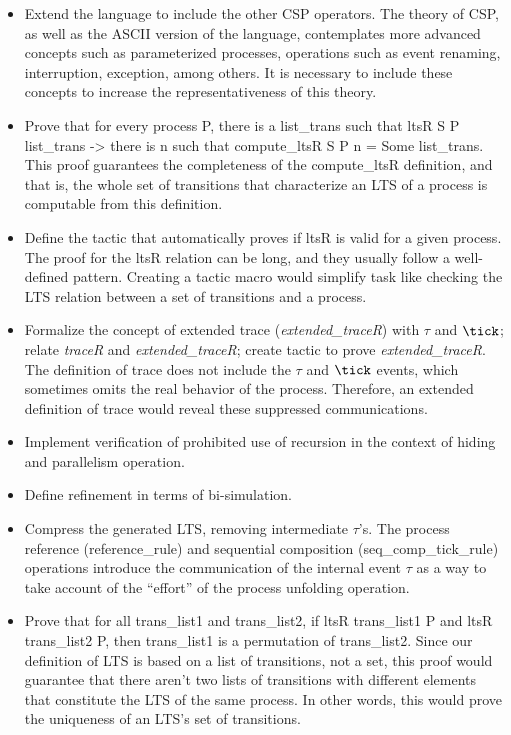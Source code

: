 \begin{itemize}
	\item Extend the language \CSPcoq{} to include the other CSP operators. The theory of CSP, as well as the ASCII version of the language, contemplates more advanced concepts such as parameterized processes, operations such as event renaming, interruption, exception, among others. It is necessary to include these concepts to increase the representativeness of this theory.
	\item Prove that for every process P, there is a list\_trans such that ltsR S P list\_trans -> there is n such that compute\_ltsR S P n = Some list\_trans. This proof guarantees the completeness of the compute\_ltsR definition, and that is, the whole set of transitions that characterize an LTS of a process is computable from this definition.
	\item Define the tactic that automatically proves if ltsR is valid for a given process. The proof for the ltsR relation can be long, and they usually follow a well-defined pattern. Creating a tactic macro would simplify task like checking the LTS relation between a set of transitions and a process.
	\item Formalize the concept of extended trace (\emph{extended\_traceR}) with $ \tau $ and $ \tick $; relate \emph{traceR} and \emph{extended\_traceR}; create tactic to prove \emph{extended\_traceR}. The definition of trace does not include the $ \tau $ and $ \tick $ events, which sometimes omits the real behavior of the process. Therefore, an extended definition of trace would reveal these suppressed communications.
	\item Implement verification of prohibited use of recursion in the context of hiding and parallelism operation.
	\item Define refinement in terms of bi-simulation.
	\item Compress the generated LTS, removing intermediate $ \tau $'s. The process reference (reference\_rule) and sequential composition (seq\_comp\_tick\_rule) operations introduce the communication of the internal event $ \tau $ as a way to take account of the ``effort'' of the process unfolding operation.
	\item Prove that for all trans\_list1 and trans\_list2, if ltsR trans\_list1 P and ltsR trans\_list2 P, then trans\_list1 is a permutation of trans\_list2. Since our definition of LTS is based on a list of transitions, not a set, this proof would guarantee that there aren't two lists of transitions with different elements that constitute the LTS of the same process. In other words, this would prove the uniqueness of an LTS's set of transitions.
\end{itemize}
